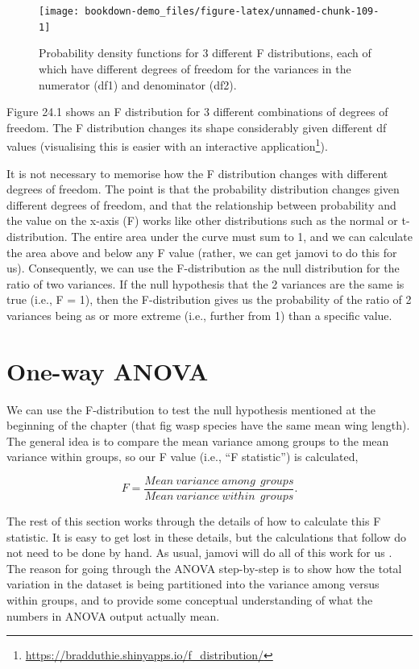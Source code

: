 \documentclass[
]{scrbook}
\begin{document}
\begin{figure}
\texttt{[image: bookdown-demo\_files/figure-latex/unnamed-chunk-109-1]} \caption{Probability density functions for 3 different F distributions, each of which have different degrees of freedom for the variances in the numerator (df1) and denominator (df2).}\label{fig:unnamed-chunk-109}
\end{figure}

Figure 24.1 shows an F distribution for 3 different combinations of degrees of freedom.
The F distribution changes its shape considerably given different df values (visualising this is easier with an interactive application\footnote{\url{https://bradduthie.shinyapps.io/f_distribution/}}).

It is not necessary to memorise how the F distribution changes with different degrees of freedom.
The point is that the probability distribution changes given different degrees of freedom, and that the relationship between probability and the value on the x-axis (F) works like other distributions such as the normal or t-distribution.
The entire area under the curve must sum to 1, and we can calculate the area above and below any F value (rather, we can get jamovi to do this for us).
Consequently, we can use the F-distribution as the null distribution for the ratio of two variances.
If the null hypothesis that the 2 variances are the same is true (i.e., F = 1), then the F-distribution gives us the probability of the ratio of 2 variances being as or more extreme (i.e., further from 1) than a specific value.

\hypertarget{one-way-anova}{%
\section{One-way ANOVA}\label{one-way-anova}}

We can use the F-distribution to test the null hypothesis mentioned at the beginning of the chapter (that fig wasp species have the same mean wing length).
The general idea is to compare the mean variance among groups to the mean variance within groups, so our F value (i.e., ``F statistic'') is calculated,

\[F = \frac{Mean\:variance\:among\:\:groups}{Mean\:variance\:within\:\:groups}.\]

The rest of this section works through the details of how to calculate this F statistic.
It is easy to get lost in these details, but the calculations that follow do not need to be done by hand.
As usual, jamovi will do all of this work for us \citep{Jamovi2022}.
The reason for going through the ANOVA step-by-step is to show how the total variation in the dataset is being partitioned into the variance among versus within groups, and to provide some conceptual understanding of what the numbers in ANOVA output actually mean.
\end{document}

